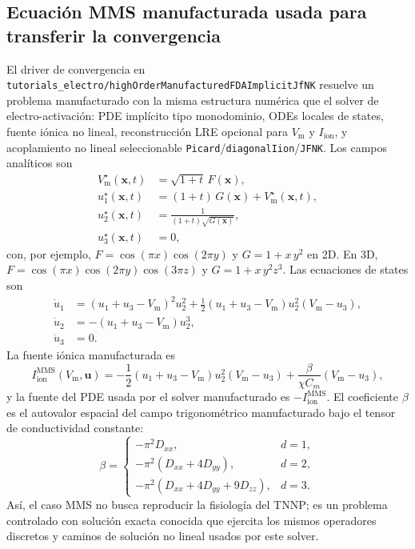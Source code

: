 \documentclass[11pt,a4paper]{article}
\newcommand{\code}[1]{\texttt{\small #1}}
\newcommand{\Vm}{V_{\text{m}}}
\newcommand{\Iion}{I_{\mathrm{ion}}}
\begin{document}
\subsection{Ecuación MMS manufacturada usada para transferir la convergencia}

El driver de convergencia en
\code{tutorials\_electro/highOrderManufacturedFDAImplicitJfNK} resuelve un problema
manufacturado con la misma estructura numérica que el solver de electro-activación:
PDE implícito tipo monodominio, ODEs locales de states, fuente iónica no lineal,
reconstrucción LRE opcional para $\Vm$ y $\Iion$, y acoplamiento no lineal
seleccionable \code{Picard}/\code{diagonalIion}/\code{JFNK}. Los campos analíticos
son
\begin{align}
  \Vm^{\star}(\mathbf{x},t) &= \sqrt{1+t}\,F(\mathbf{x}),\\
  u_1^{\star}(\mathbf{x},t) &= (1+t)\,G(\mathbf{x})+\Vm^{\star}(\mathbf{x},t),\\
  u_2^{\star}(\mathbf{x},t) &=
      \frac{1}{(1+t)\sqrt{G(\mathbf{x})}},\\
  u_3^{\star}(\mathbf{x},t) &= 0,
\end{align}
con, por ejemplo,
$F=\cos(\pi x)\cos(2\pi y)$ y $G=1+x\,y^2$ en 2D. En 3D,
$F=\cos(\pi x)\cos(2\pi y)\cos(3\pi z)$ y
$G=1+x\,y^2 z^3$. Las ecuaciones de states son
\begin{align}
  \dot u_1 &=
      (u_1+u_3-\Vm)^2 u_2^2
    + \frac{1}{2}(u_1+u_3-\Vm)u_2^2(\Vm-u_3),\\
  \dot u_2 &= -(u_1+u_3-\Vm)u_2^3,\\
  \dot u_3 &= 0.
\end{align}
La fuente iónica manufacturada es
\begin{equation}
  \Iion^{\mathrm{MMS}}(\Vm,\mathbf{u})
  =
  -\frac{1}{2}(u_1+u_3-\Vm)u_2^2(\Vm-u_3)
  + \frac{\beta}{\chi C_m}(\Vm-u_3),
\end{equation}
y la fuente del PDE usada por el solver manufacturado es
$-\Iion^{\mathrm{MMS}}$. El coeficiente $\beta$ es el autovalor espacial del campo
trigonométrico manufacturado bajo el tensor de conductividad constante:
\[
  \beta =
  \begin{cases}
    -\pi^2 D_{xx}, & d=1,\\
    -\pi^2(D_{xx}+4D_{yy}), & d=2,\\
    -\pi^2(D_{xx}+4D_{yy}+9D_{zz}), & d=3.
  \end{cases}
\]
Así, el caso MMS no busca reproducir la fisiología del TNNP; es un problema
controlado con solución exacta conocida que ejercita los mismos operadores
discretos y caminos de solución no lineal usados por este solver.
\end{document}
